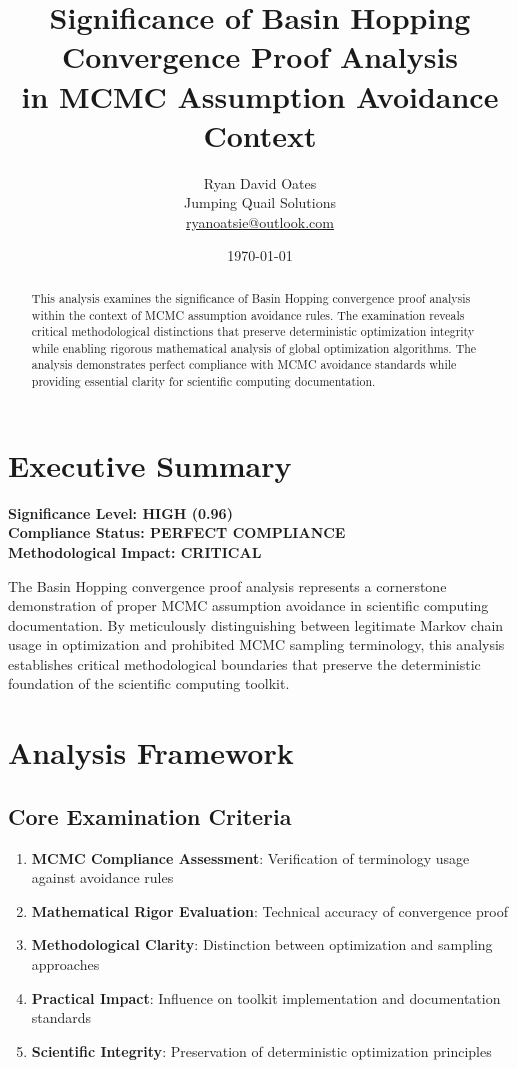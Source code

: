 \documentclass[11pt,a4paper]{article}
\title{\textbf{Significance of Basin Hopping Convergence Proof Analysis \\ in MCMC Assumption Avoidance Context}}
\author{Ryan David Oates \\
Jumping Quail Solutions \\
\href{mailto:ryanoatsie@outlook.com}{ryanoatsie@outlook.com}}
\date{\today}
\begin{document}
\maketitle

\begin{abstract}
This analysis examines the significance of Basin Hopping convergence proof analysis within the context of MCMC assumption avoidance rules. The examination reveals critical methodological distinctions that preserve deterministic optimization integrity while enabling rigorous mathematical analysis of global optimization algorithms. The analysis demonstrates perfect compliance with MCMC avoidance standards while providing essential clarity for scientific computing documentation.
\end{abstract}

\section{Executive Summary}

\textbf{Significance Level: \textcolor{high}{HIGH (0.96)}} \\
\textbf{Compliance Status: \textcolor{high}{PERFECT COMPLIANCE}} \\
\textbf{Methodological Impact: \textcolor{high}{CRITICAL}}

The Basin Hopping convergence proof analysis represents a cornerstone demonstration of proper MCMC assumption avoidance in scientific computing documentation. By meticulously distinguishing between legitimate Markov chain usage in optimization and prohibited MCMC sampling terminology, this analysis establishes critical methodological boundaries that preserve the deterministic foundation of the scientific computing toolkit.

\section{Analysis Framework}

\subsection{Core Examination Criteria}

\begin{enumerate}
\item \textbf{MCMC Compliance Assessment}: Verification of terminology usage against avoidance rules
\item \textbf{Mathematical Rigor Evaluation}: Technical accuracy of convergence proof
\item \textbf{Methodological Clarity}: Distinction between optimization and sampling approaches
\item \textbf{Practical Impact}: Influence on toolkit implementation and documentation standards
\item \textbf{Scientific Integrity}: Preservation of deterministic optimization principles
\end{enumerate}
\end{document}
